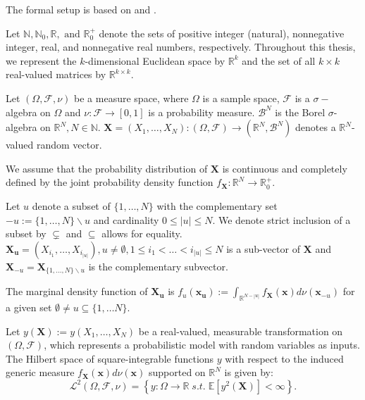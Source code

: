 The formal setup is based on \cite{chastaing2012} and \cite{rahman2014}.\par
Let $\mathbb{N}, \mathbb{N}_0, \mathbb{R}, \text{ and } \mathbb{R}_0^{+}$ denote the sets of positive integer (natural), nonnegative integer, real, and nonnegative real numbers, respectively. Throughout this thesis, we represent the $k$-dimensional Euclidean space by $\mathbb{R}^k$ and the set of all $k \times k$ real-valued matrices by $\mathbb{R}^{k \times k}$.\par
Let $(\Omega, \mathcal{F}, \nu)$ be a measure space, where $\Omega$ is a sample space, $\mathcal{F}$ is a $\sigma-$algebra on $\Omega$ and $\nu: \mathcal{F} \rightarrow [0, 1]$ is a probability measure. $\mathcal{B}^N$ is the Borel $\sigma$-algebra on $\mathbb{R}^N, N \in \mathbb{N}$.
$\boldsymbol{X} = (X_1, \dots, X_N): (\Omega, \mathcal{F}) \rightarrow (\mathbb{R}^N, \mathcal{B}^N)$ denotes a $\mathbb{R}^N$-valued random vector.\par
We assume that the probability distribution of $\boldsymbol{X}$ is continuous and completely defined by the joint probability density function $f_{\boldsymbol{X}}: \mathbb{R}^N \rightarrow \mathbb{R}_{0}^+$. %

Let $u$ denote a subset of $\{1, \dots, N\}$ with the complementary set  $-u := \{1, \dots, N\} \backslash{} u$ and cardinality $0 \leq |u| \leq N$. We denote strict inclusion of a subset by $\subsetneq$ and $\subseteq$ allows for equality.
$\boldsymbol{X_u} = (X_{i_1}, \dots, X_{i_{|u|}}), u \neq \emptyset, 1 \leq i_1 < \dots < i_{|u|} \leq N$ is a sub-vector of $\boldsymbol{X}$ and $\boldsymbol{X}_{-u} = \boldsymbol{X}_{\{1, \dots, N\} \backslash{} u}$ is the complementary subvector.

The marginal density function of $\boldsymbol{X_u}$ is $f_u(\boldsymbol{x_u}) := \int_{\mathbb{R}^{N-|u|}} f_{\boldsymbol{X}}(\boldsymbol{x})d \nu (\boldsymbol{x}_{-u})$ for a given set $\emptyset \neq u \subseteq \{1, \dots N\}$.\par
Let $y(\boldsymbol{X}) := y(X_1, \dots, X_N)$ be a real-valued, measurable transformation on $(\Omega, \mathcal{F})$, which represents a probabilistic model with random variables as inputs. The Hilbert space of square-integrable functions $y$ with respect to the induced generic measure $f_{\boldsymbol{X}}(\boldsymbol{x})d \nu (\boldsymbol{x})$ supported on $\mathbb{R}^N$ is given by:
\[
\mathcal{L}^2(\Omega, \mathcal{F}, \nu) = \left\{ y: \Omega \rightarrow \mathbb{R} \; \textit{s.t.} \; \mathbb{E}[y^2(\boldsymbol{X})] < \infty \right\}.
\]

